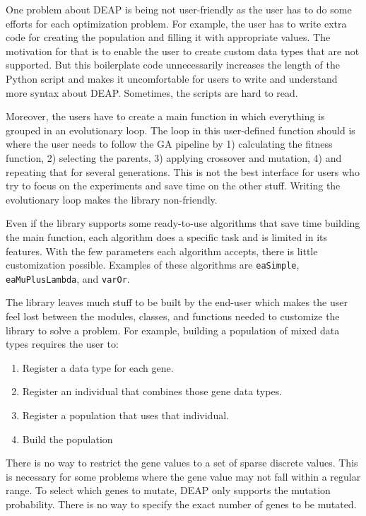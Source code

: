 \documentclass[conference]{IEEEtran}
\begin{document}
One problem about DEAP is being not user-friendly as the user has to do some efforts for each optimization problem. For example, the user has to write extra code for creating the population and filling it with appropriate values. The motivation for that is to enable the user to create custom data types that are not supported. But this boilerplate code unnecessarily increases the length of the Python script and makes it uncomfortable for users to write and understand more syntax about DEAP. Sometimes, the scripts are hard to read.

Moreover, the users have to create a main function in which everything is grouped in an evolutionary loop. The loop in this user-defined function should is where the user needs to follow the GA pipeline by 1) calculating the fitness function, 2) selecting the parents, 3) applying crossover and mutation, 4) and repeating that for several generations. This is not the best interface for users who try to focus on the experiments and save time on the other stuff. Writing the evolutionary loop makes the library non-friendly.

Even if the library supports some ready-to-use algorithms that save time building the main function, each algorithm does a specific task and is limited in its features. With the few parameters each algorithm accepts, there is little customization possible. Examples of these algorithms are \texttt{eaSimple}, \texttt{eaMuPlusLambda}, and \texttt{varOr}.

The library leaves much stuff to be built by the end-user which makes the user feel lost between the modules, classes, and functions needed to customize the library to solve a problem. For example, building a population of mixed data types requires the user to:

\begin{enumerate}
  \item Register a data type for each gene.
  \item Register an individual that combines those gene data types.
  \item Register a population that uses that individual.
  \item Build the population
\end{enumerate}

There is no way to restrict the gene values to a set of sparse discrete values. This is necessary for some problems where the gene value may not fall within a regular range. To select which genes to mutate, DEAP only supports the mutation probability. There is no way to specify the exact number of genes to be mutated. 
\end{document}
